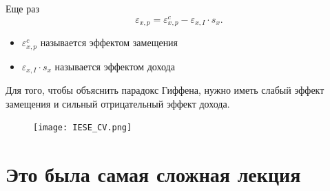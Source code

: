 \documentclass{beamer}
\begin{document}
\begin{frame}
Еще раз
$$\varepsilon_{x,p} = \varepsilon^c_{x,p} - \varepsilon_{x,I} \cdot s_{x}.$$

\begin{itemize}
\item $\varepsilon^c_{x,p}$ называется эффектом замещения
\item $\varepsilon_{x,I} \cdot s_{x}$ называется эффектом дохода
\end{itemize}

Для того, чтобы объяснить парадокс Гиффена, нужно иметь слабый эффект замещения и сильный отрицательный эффект дохода.

\end{frame}

\begin{frame}
\begin{figure}[hbt]
\centering
\texttt{[image: IESE\_CV.png]}
\end{figure}

\end{frame}

\section{Это была самая сложная лекция}
\end{document}
